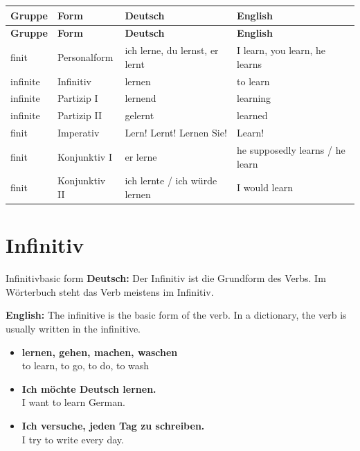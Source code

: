 \documentclass[a4paper,11pt]{article}
\newcommand{\GermanText}[1]{\textbf{Deutsch: }#1\par}
\newcommand{\EnglishText}[1]{{\small\color{SoftGray}\textbf{English: }#1\par}}
\newcommand{\ExampleItem}[2]{\item \textbf{#1}\\{\small\color{SoftGray}#2}}
\begin{document}
\begin{longtable}{L{3.2cm}L{4cm}L{4.2cm}L{4.2cm}}
\color{white}\textbf{Gruppe} & \color{white}\textbf{Form} & \color{white}\textbf{Deutsch} & \color{white}\textbf{English} \\
\endfirsthead
{}
\color{white}\textbf{Gruppe} & \color{white}\textbf{Form} & \color{white}\textbf{Deutsch} & \color{white}\textbf{English} \\
\endhead
finit & Personalform & ich lerne, du lernst, er lernt & I learn, you learn, he learns \\
infinite & Infinitiv & lernen & to learn \\
infinite & Partizip I & lernend & learning \\
infinite & Partizip II & gelernt & learned \\
finit & Imperativ & Lern! Lernt! Lernen Sie! & Learn! \\
finit & Konjunktiv I & er lerne & he supposedly learns / he learn \\
finit & Konjunktiv II & ich lernte / ich würde lernen & I would learn \\
\end{longtable}

\section{Infinitiv}

\begin{grammarentry}{Infinitiv}{basic form}
\GermanText{Der Infinitiv ist die Grundform des Verbs. Im Wörterbuch steht das Verb meistens im Infinitiv.}
\EnglishText{The infinitive is the basic form of the verb. In a dictionary, the verb is usually written in the infinitive.}

\begin{exbox}
\begin{itemize}
    \ExampleItem{lernen, gehen, machen, waschen}{to learn, to go, to do, to wash}
    \ExampleItem{Ich möchte Deutsch lernen.}{I want to learn German.}
    \ExampleItem{Ich versuche, jeden Tag zu schreiben.}{I try to write every day.}
\end{itemize}
\end{exbox}
\end{grammarentry}
\end{document}
